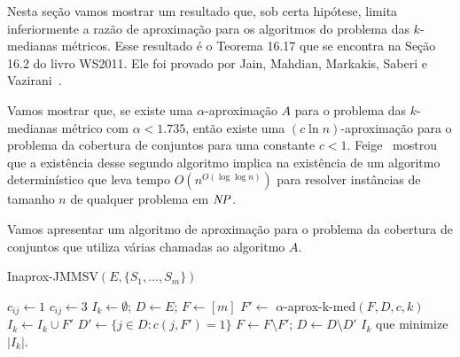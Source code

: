 Nesta seção vamos mostrar um resultado que, sob certa hipótese, limita inferiormente a razão de aproximação para os algoritmos do problema das $k$-medianas métricos. Esse resultado é o Teorema 16.17 que se encontra na Seção 16.2 do livro WS2011. Ele foi provado por Jain, Mahdian, Markakis, Saberi e Vazirani~\cite{jain2002greedy}.

Vamos mostrar que, se existe uma $\alpha$-aproximação $A$ para o problema das $k$-medianas métrico com $\alpha < 1.735$, então existe uma $(c \ln n)$-aproximação para o problema da cobertura de conjuntos para uma constante $c<1$. 
Feige~\cite{Feige98} mostrou que a existência desse segundo algoritmo implica na existência de um algoritmo determinístico que leva tempo $O(n^{O(\log\log n)})$ para resolver instâncias de tamanho $n$ de qualquer problema em $\mathit{NP}$.

Vamos apresentar um algoritmo de aproximação para o problema da cobertura de conjuntos que utiliza várias chamadas ao algoritmo $A$.

\begin{algorithm}
    \caption{\sc Inaprox-JMMSV$(E,\{S_1,\ldots,S_m\})$}
    \begin{algorithmic}[1]
            \State $c_{ij} \gets 1$
            \Else
            \State $c_{ij} \gets 3$
            \EndIf
            \EndFor
        \EndFor
            \State $I_k \gets \emptyset$; $D \gets E$; $F \gets [m]$
                \State $F' \gets$ {\sc $\alpha$-aprox-k-med}$(F,D,c,k)$
                \State $I_k \gets I_k \cup F'$
                \State $D' \gets \{j \in D: c(j,F') = 1 \}$
                \State $F \gets F \setminus F'$; $D\gets D\setminus D'$
            \EndWhile
        \EndFor
    \State \Return $I_k$ que minimize $|I_k|$.
    \end{algorithmic}
\end{algorithm}

